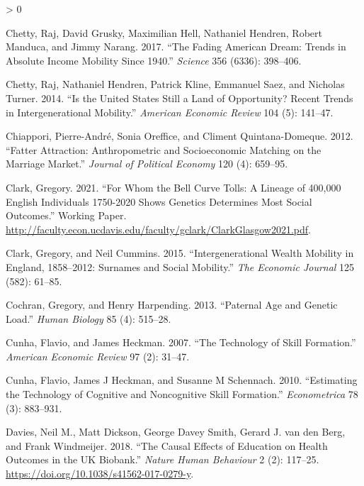 \documentclass[
]{article}
\newlength{\cslhangindent}
\newenvironment{CSLReferences}[2] %
 {%
  \setlength{\parindent}{0pt}
  \ifodd #1 \everypar{\setlength{\hangindent}{\cslhangindent}}\ignorespaces\fi
  \ifnum #2 > 0
  \setlength{\parskip}{#2\baselineskip}
  \fi
 }%
 {}
\begin{document}
\begin{CSLReferences}{1}{0}
\leavevmode\hypertarget{ref-chetty2017fading}{}%
Chetty, Raj, David Grusky, Maximilian Hell, Nathaniel Hendren, Robert Manduca, and Jimmy Narang. 2017. {``The Fading American Dream: Trends in Absolute Income Mobility Since 1940.''} \emph{Science} 356 (6336): 398--406.

\leavevmode\hypertarget{ref-chetty2014united}{}%
Chetty, Raj, Nathaniel Hendren, Patrick Kline, Emmanuel Saez, and Nicholas Turner. 2014. {``Is the United States Still a Land of Opportunity? Recent Trends in Intergenerational Mobility.''} \emph{American Economic Review} 104 (5): 141--47.

\leavevmode\hypertarget{ref-chiappori2012fatter}{}%
Chiappori, Pierre-André, Sonia Oreffice, and Climent Quintana-Domeque. 2012. {``Fatter Attraction: Anthropometric and Socioeconomic Matching on the Marriage Market.''} \emph{Journal of Political Economy} 120 (4): 659--95.

\leavevmode\hypertarget{ref-clark2021bell}{}%
Clark, Gregory. 2021. {``For Whom the Bell Curve Tolls: A Lineage of 400,000 English Individuals 1750-2020 Shows Genetics Determines Most Social Outcomes.''} Working Paper. \url{http://faculty.econ.ucdavis.edu/faculty/gclark/ClarkGlasgow2021.pdf}.

\leavevmode\hypertarget{ref-clark2015intergenerational}{}%
Clark, Gregory, and Neil Cummins. 2015. {``Intergenerational Wealth Mobility in England, 1858--2012: Surnames and Social Mobility.''} \emph{The Economic Journal} 125 (582): 61--85.

\leavevmode\hypertarget{ref-cochran2013paternal}{}%
Cochran, Gregory, and Henry Harpending. 2013. {``Paternal Age and Genetic Load.''} \emph{Human Biology} 85 (4): 515--28.

\leavevmode\hypertarget{ref-cunha2007technology}{}%
Cunha, Flavio, and James Heckman. 2007. {``The Technology of Skill Formation.''} \emph{American Economic Review} 97 (2): 31--47.

\leavevmode\hypertarget{ref-cunha2010estimating}{}%
Cunha, Flavio, James J Heckman, and Susanne M Schennach. 2010. {``Estimating the Technology of Cognitive and Noncognitive Skill Formation.''} \emph{Econometrica} 78 (3): 883--931.

\leavevmode\hypertarget{ref-Davies_2018}{}%
Davies, Neil M., Matt Dickson, George Davey Smith, Gerard J. van den Berg, and Frank Windmeijer. 2018. {``The Causal Effects of Education on Health Outcomes in the {UK} Biobank.''} \emph{Nature Human Behaviour} 2 (2): 117--25. \url{https://doi.org/10.1038/s41562-017-0279-y}.


\end{CSLReferences}
\end{document}
